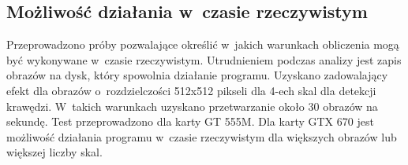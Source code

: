 \subsection{Możliwość działania w~czasie rzeczywistym}
\label{dzialanieRT}

Przeprowadzono próby pozwalające określić w~jakich warunkach obliczenia mogą być wykonywane w~czasie rzeczywistym. Utrudnieniem podczas analizy jest zapis obrazów na dysk, który spowolnia działanie programu. Uzyskano zadowalający efekt dla obrazów o~rozdzielczości 512x512 pikseli dla 4-ech skal dla detekcji krawędzi. W~takich warunkach uzyskano przetwarzanie około 30 obrazów na sekundę. Test przeprowadzono dla karty GT 555M. Dla karty GTX 670 jest możliwość działania programu w~czasie rzeczywistym dla większych obrazów lub większej liczby skal.
